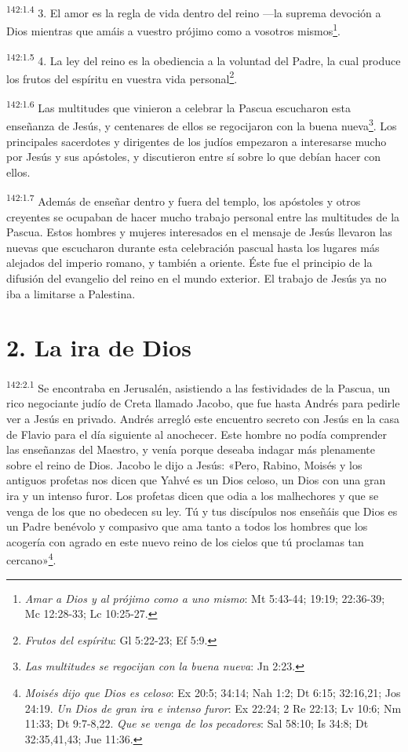 \par
\textsuperscript{142:1.4} 3. El amor es la regla de vida dentro del reino ---la suprema devoción a Dios mientras que amáis a vuestro prójimo como a vosotros mismos\footnote{\textit{Amar a Dios y al prójimo como a uno mismo}: Mt 5:43-44; 19:19; 22:36-39; Mc 12:28-33; Lc 10:25-27.}.

\par
\textsuperscript{142:1.5} 4. La ley del reino es la obediencia a la voluntad del Padre, la cual produce los frutos del espíritu en vuestra vida personal\footnote{\textit{Frutos del espíritu}: Gl 5:22-23; Ef 5:9.}.

\par
\textsuperscript{142:1.6} Las multitudes que vinieron a celebrar la Pascua escucharon esta enseñanza de Jesús, y centenares de ellos se regocijaron con la buena nueva\footnote{\textit{Las multitudes se regocijan con la buena nueva}: Jn 2:23.}. Los principales sacerdotes y dirigentes de los judíos empezaron a interesarse mucho por Jesús y sus apóstoles, y discutieron entre sí sobre lo que debían hacer con ellos.

\par
\textsuperscript{142:1.7} Además de enseñar dentro y fuera del templo, los apóstoles y otros creyentes se ocupaban de hacer mucho trabajo personal entre las multitudes de la Pascua. Estos hombres y mujeres interesados en el mensaje de Jesús llevaron las nuevas que escucharon durante esta celebración pascual hasta los lugares más alejados del imperio romano, y también a oriente. Éste fue el principio de la difusión del evangelio del reino en el mundo exterior. El trabajo de Jesús ya no iba a limitarse a Palestina.

\section*{2. La ira de Dios}
\par
\textsuperscript{142:2.1} Se encontraba en Jerusalén, asistiendo a las festividades de la Pascua, un rico negociante judío de Creta llamado Jacobo, que fue hasta Andrés para pedirle ver a Jesús en privado. Andrés arregló este encuentro secreto con Jesús en la casa de Flavio para el día siguiente al anochecer. Este hombre no podía comprender las enseñanzas del Maestro, y venía porque deseaba indagar más plenamente sobre el reino de Dios. Jacobo le dijo a Jesús: «Pero, Rabino, Moisés y los antiguos profetas nos dicen que Yahvé es un Dios celoso, un Dios con una gran ira y un intenso furor. Los profetas dicen que odia a los malhechores y que se venga de los que no obedecen su ley. Tú y tus discípulos nos enseñáis que Dios es un Padre benévolo y compasivo que ama tanto a todos los hombres que los acogería con agrado en este nuevo reino de los cielos que tú proclamas tan cercano»\footnote{\textit{Moisés dijo que Dios es celoso}: Ex 20:5; 34:14; Nah 1:2; Dt 6:15; 32:16,21; Jos 24:19. \textit{Un Dios de gran ira e intenso furor}: Ex 22:24; 2 Re 22:13; Lv 10:6; Nm 11:33; Dt 9:7-8,22. \textit{Que se venga de los pecadores}: Sal 58:10; Is 34:8; Dt 32:35,41,43; Jue 11:36.}.

